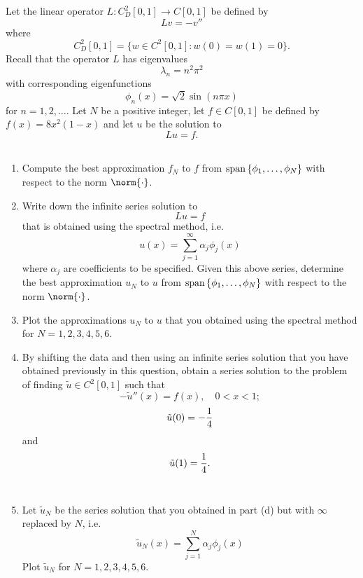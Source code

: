 
Let the linear operator $L: C^2_D[0,1]\to C[0,1]$ be defined by
\[
L v = -v''
\]
where
\[
C^2_D[0,1] = \{ w \in C^2[0,1] : w(0) = w(1) = 0\}.
\]
Recall that the operator $L$ has eigenvalues
\[
\lambda_n = n^2 \pi^2
\]
with corresponding eigenfunctions
\[
\phi_n(x) = \sqrt{2} \sin(n \pi x)
\]
for $n=1,2,\ldots$. Let $N$ be a positive integer, let $f\in C[0,1]$ be defined by $f(x) = 8x^2(1-x)$ and let $u$ be the solution to
\[
Lu=f.
\]
\\
\begin{enumerate}
\item Compute the best approximation $f_N$ to $f$ from ${\rm span}\left\{\phi_1,\ldots,\phi_N\right\}$ with respect to the norm $\norm{\cdot}$.
\\
\item Write down the infinite series solution to
\[
Lu=f
\]
that is obtained using the spectral method, i.e.
\[
u(x) = \sum_{j = 1}^\infty \alpha_j \phi_j(x)
\]
where $\alpha_j$ are coefficients to be specified.  Given this above series, determine the best approximation $u_N$ to $u$ from ${\rm span}\left\{\phi_1,\ldots,\phi_N\right\}$ with respect to the norm $\norm{\cdot}$.
\\
\item Plot the approximations $u_N$ to $u$ that you obtained using the spectral method for $N=1,2,3,4,5,6$.
\\
\item By shifting the data and then using an infinite series solution that you have obtained previously in this question, obtain a series solution to the problem of finding $\tilde{u}\in C^2[0,1]$ such that
\[
-\tilde{u}''(x)=f(x),\quad 0<x<1;
\]
\[
\tilde{u}(0) = -{1\over 4}
\]
and
\[
\tilde{u}(1) = {1\over 4}.
\]
\\
\item Let $\tilde{u}_N$ be the series solution that you obtained in part (d) but with $\infty$ replaced by $N$, i.e.
\[
\tilde{u}_N(x) = \sum_{j = 1}^N \alpha_j \phi_j(x)
\]
Plot $\tilde{u}_N$ for $N=1,2,3,4,5,6$.
\end{enumerate}

           


